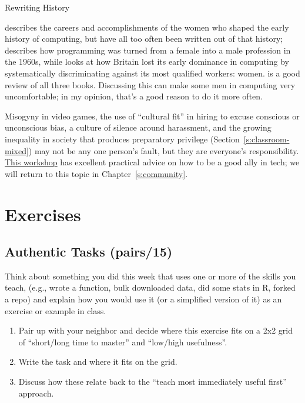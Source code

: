 \begin{aside}{Rewriting History}

\cite{Abba2012} describes the careers and accomplishments of the
women who shaped the early history of computing, but have all too
often been written out of that history; \cite{Ensm2003,Ensm2012}
describes how programming was turned from a female into a male
profession in the 1960s, while \cite{Hick2018} looks at how Britain
lost its early dominance in computing by systematically discriminating
against its most qualified workers: women. \cite{Milt2018} is a
good review of all three books. Discussing this can make some men in
computing very uncomfortable; in my opinion, that's a good reason to
do it more often.

\end{aside}

Misogyny in video games, the use of ``cultural fit'' in hiring to excuse
conscious or unconscious bias, a culture of silence around harassment,
and the growing inequality in society that produces preparatory
privilege (Section~\ref{s:classroom-mixed}) may not be any one person's
fault, but they are everyone's responsibility. \href{https://frameshiftconsulting.com/ally-skills-workshop/}{This
workshop} has excellent practical advice on how to be
a good ally in tech; we will return to this topic in
Chapter~\ref{s:community}.

\section{Exercises}\label{s:motivation-exercises}

\subsection*{Authentic Tasks (pairs/15)}

Think about something you did this week that uses one or more of the
skills you teach, (e.g., wrote a function, bulk downloaded data, did
some stats in R, forked a repo) and explain how you would use it (or a
simplified version of it) as an exercise or example in class.

\begin{enumerate}
\item
  Pair up with your neighbor and decide where this exercise fits on a
  2x2 grid of ``short/long time to master'' and ``low/high
  usefulness''.
\item
  Write the task and where it fits on the grid.
\item
  Discuss how these relate back to the ``teach most immediately useful
  first'' approach.
\end{enumerate}

